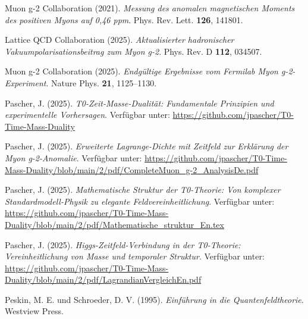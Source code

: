 \documentclass[12pt,a4paper]{article}
\theoremstyle{definition}
\begin{document}
	\begin{thebibliography}{20}
		
		Muon g-2 Collaboration (2021). 
		\textit{Messung des anomalen magnetischen Moments des positiven Myons auf 0,46 ppm}. 
		Phys. Rev. Lett. \textbf{126}, 141801.
		
		Lattice QCD Collaboration (2025).
		\textit{Aktualisierter hadronischer Vakuumpolarisationsbeitrag zum Myon g-2}.
		Phys. Rev. D \textbf{112}, 034507.
		
		Muon g-2 Collaboration (2025).
		\textit{Endgültige Ergebnisse vom Fermilab Myon g-2-Experiment}.
		Nature Phys. \textbf{21}, 1125–1130.
		
		Pascher, J. (2025). 
		\textit{T0-Zeit-Masse-Dualität: Fundamentale Prinzipien und experimentelle Vorhersagen}. 
		Verfügbar unter: \url{https://github.com/jpascher/T0-Time-Mass-Duality}
		
		Pascher, J. (2025). 
		\textit{Erweiterte Lagrange-Dichte mit Zeitfeld zur Erklärung der Myon g-2-Anomalie}. 
		Verfügbar unter: \url{https://github.com/jpascher/T0-Time-Mass-Duality/blob/main/2/pdf/CompleteMuon_g-2_AnalysisDe.pdf}
		
		Pascher, J. (2025). 
		\textit{Mathematische Struktur der T0-Theorie: Von komplexer Standardmodell-Physik zu elegante Feldvereinheitlichung}. 
		Verfügbar unter: \url{https://github.com/jpascher/T0-Time-Mass-Duality/blob/main/2/pdf/Mathematische_struktur_En.tex}
		
		Pascher, J. (2025). 
		\textit{Higgs-Zeitfeld-Verbindung in der T0-Theorie: Vereinheitlichung von Masse und temporaler Struktur}. 
		Verfügbar unter: \url{https://github.com/jpascher/T0-Time-Mass-Duality/blob/main/2/pdf/LagrandianVergleichEn.pdf}
		
		Peskin, M. E. und Schroeder, D. V. (1995). 
		\textit{Einführung in die Quantenfeldtheorie}. 
		Westview Press.
		
	\end{thebibliography}
	
\end{document}
